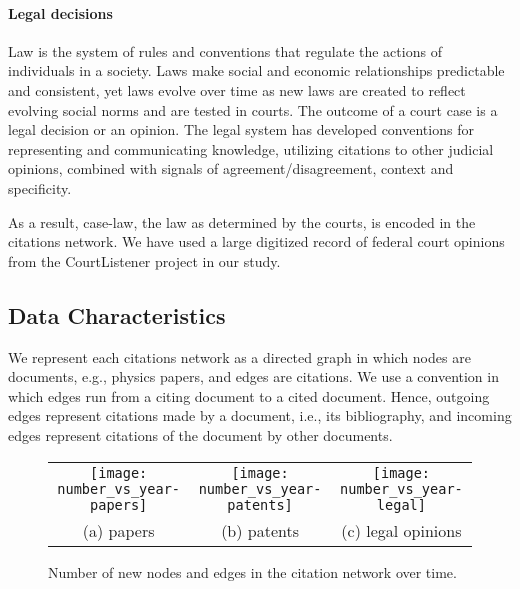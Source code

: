 \documentclass[10pt]{bmc_article}
\newenvironment{bmcformat}{\baselineskip20pt\sloppy\setboolean{publ}{false}}{\baselineskip20pt\sloppy}
\begin{document}
\begin{bmcformat}
\paragraph{Legal decisions}
Law is the system of rules and conventions that regulate the actions of individuals in a society. Laws make social and economic relationships predictable and consistent, yet laws evolve over time as new laws are created to reflect evolving social norms and are tested in courts. The outcome of a court case is a legal decision or an opinion.%
The legal system has developed conventions for representing and communicating knowledge, utilizing citations to other judicial opinions, combined with signals of agreement/disagreement, context and specificity.

As a result, case-law, the law as determined by the courts, is encoded in the citations network.
We have used a large digitized record of federal court opinions from the CourtListener project in our study.


\subsection{Data Characteristics}

We represent each citations network as a directed graph in which nodes are documents, e.g., physics papers, and edges are citations. We use a convention in which edges run from a citing document to a cited document. Hence, outgoing edges represent citations made by a document, i.e., its bibliography,  and incoming edges represent citations of the document by other documents.


\begin{figure}[htbp] %
\centering
   \begin{tabular}{@{}c@{}c@{}c@{}}
   \texttt{[image: number\_vs\_year-papers]} &
   \texttt{[image: number\_vs\_year-patents]} &
   \texttt{[image: number\_vs\_year-legal]} \\
(a) papers & (b) patents & (c) legal opinions
\end{tabular}
   \caption{Number of new nodes and edges in the citation network over time. }
   \label{fig:nodes}
\end{figure}


\end{bmcformat}
\end{document}
